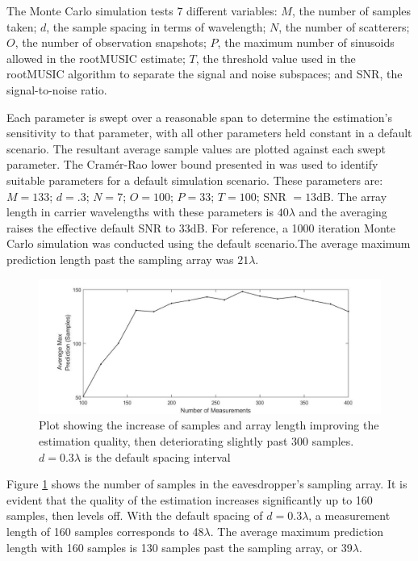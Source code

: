 \documentclass{allertonproc}
\begin{document}
The Monte Carlo simulation tests 7 different variables: $M$, the number of samples taken; $d$, the sample spacing in terms of wavelength; $N$, the number of scatterers; $O$, the number of observation snapshots; $P$, the maximum number of sinusoids allowed in the rootMUSIC estimate; $T$, the threshold value used in the rootMUSIC algorithm to separate the signal and noise subspaces; and SNR, the signal-to-noise ratio.

Each parameter is swept over a reasonable span to determine the estimation's sensitivity to that parameter, with all other parameters held constant in a default scenario. The resultant average sample values are plotted against each swept parameter. The Cram\'er-Rao lower bound presented in \cite{kckpVTC2015} was used to identify suitable parameters for a default simulation scenario. These parameters are: $M = 133$; $d = .3$; $N = 7$; $O = 100$; $P = 33$; $T = 100$; SNR $= 13$dB. The array length in carrier wavelengths with these parameters is $40\lambda$ and the averaging raises the effective default SNR to $33$dB. For reference, a 1000 iteration Monte Carlo simulation was conducted using the default scenario.The average maximum prediction length past the sampling array was $21\lambda$.


\begin{figure}[tbp]
\begin{center}
\includegraphics[width=6in]{numMeasurements.jpg}
\caption{Plot showing the increase of samples and array length improving the estimation quality, then deteriorating slightly past 300 samples. $d = 0.3\lambda$ is the default spacing interval}\label{M}
\end{center}
\end{figure}
Figure \ref{M} shows the number of samples in the eavesdropper's sampling array. It is evident that the quality of the estimation increases significantly up to 160 samples, then levels off. With the default spacing of $d = 0.3\lambda$, a measurement length of 160 samples corresponds to 48$\lambda$. The average maximum prediction length with 160 samples is 130 samples past the sampling array, or 39$\lambda$.
\end{document}
